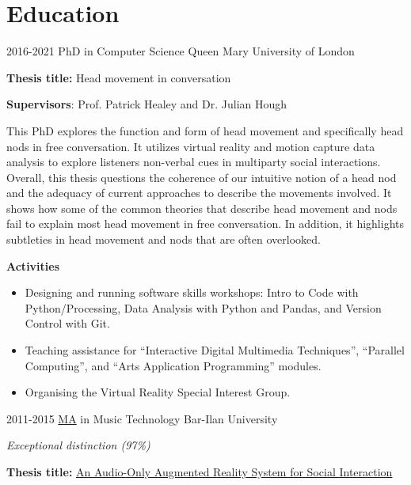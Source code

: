 \documentclass[]{friggeri-cv}
\begin{document}
\clearpage


\section{Education}

\begin{entrylist}

  \entry
  {2016-2021}
  {PhD in Computer Science}
  {Queen Mary University of London}
  {
    \textbf{Thesis title:} Head movement in conversation

    \textbf{Supervisors}: Prof. Patrick Healey and Dr. Julian Hough

    This PhD explores the function and form of head movement and specifically head nods in free conversation.
    It utilizes virtual reality and motion capture data analysis to explore listeners non-verbal cues in multiparty social interactions.
    Overall, this thesis questions the coherence of our intuitive notion of a head nod and the adequacy of current approaches to describe the movements involved.
    It shows how some of the common theories that describe head movement and nods fail to explain most head movement in free conversation.
    In addition, it highlights subtleties in head movement and nods that are often overlooked.

    \textbf{Activities}
    \begin{itemize}
      \item
        Designing and running software skills workshops: Intro to Code with Python/Processing, Data Analysis with Python and Pandas, and Version Control with Git.
      \item
        Teaching assistance for ``Interactive Digital Multimedia Techniques'', ``Parallel Computing'', and ``Arts Application Programming'' modules.
      \item
        Organising the Virtual Reality Special Interest Group.
    \end{itemize}
  }

  \entry
  {2011-2015}
  {\href{http://www.tomgurion.me/pdfs/MA.pdf}{MA} in Music Technology}
  {Bar-Ilan University}
  {
    \textit{Exceptional distinction (97\%)}

    \textbf{Thesis title:} \href{http://www.tomgurion.me/pdfs/Gurion - An Audio-Only Augmented Reality System for Social Interaction.pdf}{An Audio-Only Augmented Reality System for Social Interaction}

}
\end{entrylist}
\end{document}
